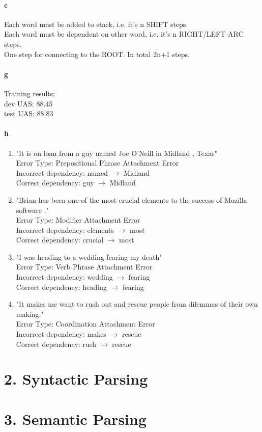 \documentclass{article}
\begin{document}
\paragraph{c}
Each word must be added to stack, i.e. it's n SHIFT steps. \\
Each word must be dependent on other word, i.e. it's n RIGHT/LEFT-ARC steps. \\
One step for connecting to the ROOT. In total 2n+1 steps. \\

\paragraph{g} Training results: \\
dev UAS: 88.45 \\
test UAS: 88.83 \\

\paragraph{h}
\begin{enumerate}
\item
"It is on loan from a guy named Joe O’Neill in Midland , Texas" \\
    Error Type: Prepositional Phrase Attachment Error \\
    Incorrect dependency: named $\rightarrow$ Midland \\
    Correct dependency: guy $\rightarrow$ Midland \\

\item
"Brian has been one of the most crucial elements to the success of Mozilla software ." \\
    Error Type: Modifier Attachment Error \\
    Incorrect dependency: elements $\rightarrow$ most \\
    Correct dependency: crucial $\rightarrow$ most \\

\item
"I was heading to a wedding fearing my death" \\
    Error Type: Verb Phrase Attachment Error \\
    Incorrect dependency: wedding $\rightarrow$ fearing \\
    Correct dependency: heading $\rightarrow$ fearing \\
    
\item
"It makes me want to rush out and rescue people from dilemmas of their own making." \\
    Error Type: Coordination Attachment Error \\
    Incorrect dependency: makes $\rightarrow$ rescue \\
    Correct dependency: rush $\rightarrow$ rescue \\
\end{enumerate}

\section*{2. Syntactic Parsing}


\section*{3. Semantic Parsing}
\end{document}
